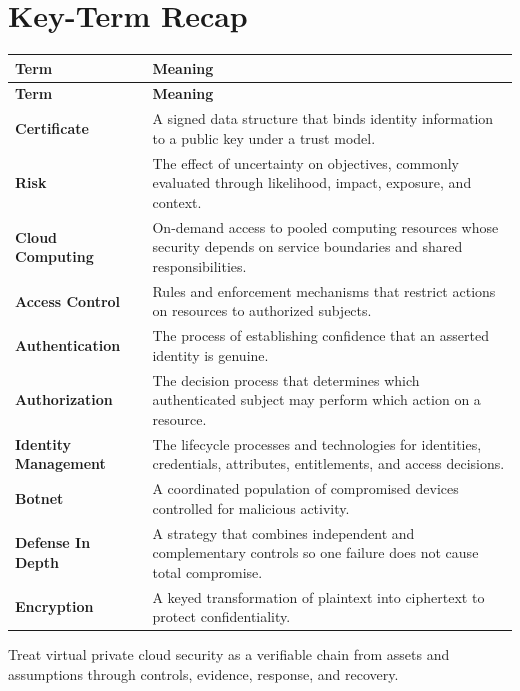 \documentclass[11pt]{article}
\begin{document}
\section*{Key-Term Recap}
\begin{longtable}{>{\RaggedRight\arraybackslash}p{}>{\RaggedRight\arraybackslash}p{}}
\toprule\rowcolor{Navy}\color{white}\textbf{Term} & \color{white}\textbf{Meaning}\\\midrule
\endfirsthead
\toprule\rowcolor{Navy}\color{white}\textbf{Term} & \color{white}\textbf{Meaning}\\\midrule
\endhead
\textbf{Certificate} & A signed data structure that binds identity information to a public key under a trust model. \\\midrule
\textbf{Risk} & The effect of uncertainty on objectives, commonly evaluated through likelihood, impact, exposure, and context. \\\midrule
\textbf{Cloud Computing} & On-demand access to pooled computing resources whose security depends on service boundaries and shared responsibilities. \\\midrule
\textbf{Access Control} & Rules and enforcement mechanisms that restrict actions on resources to authorized subjects. \\\midrule
\textbf{Authentication} & The process of establishing confidence that an asserted identity is genuine. \\\midrule
\textbf{Authorization} & The decision process that determines which authenticated subject may perform which action on a resource. \\\midrule
\textbf{Identity Management} & The lifecycle processes and technologies for identities, credentials, attributes, entitlements, and access decisions. \\\midrule
\textbf{Botnet} & A coordinated population of compromised devices controlled for malicious activity. \\\midrule
\textbf{Defense In Depth} & A strategy that combines independent and complementary controls so one failure does not cause total compromise. \\\midrule
\textbf{Encryption} & A keyed transformation of plaintext into ciphertext to protect confidentiality. \\\midrule
\bottomrule
\end{longtable}
\begin{takeawaybox}
Treat virtual private cloud security as a verifiable chain from assets and assumptions through controls, evidence, response, and recovery.
\end{takeawaybox}
\end{document}
